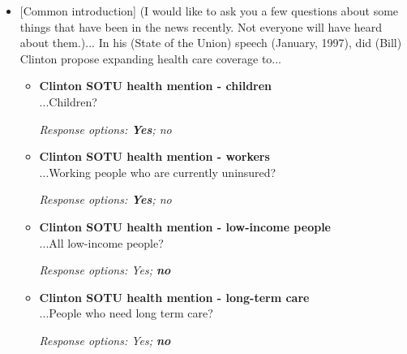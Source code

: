 \documentclass[12pt, letterpaper]{article}
\begin{document}
\begin{itemize}
\item{[Common introduction] (I would like to ask you a few questions about some things that have been in the news recently. Not everyone will have heard about them.)... In his (State of the Union) speech (January, 1997), did (Bill) Clinton propose expanding health care coverage to...

   \begin{itemize}
\item \textbf{Clinton SOTU health mention - children} \\
...Children?

\textit{Response options: \textbf{Yes}; no} 
\end{itemize}

   \begin{itemize}
\item \textbf{Clinton SOTU health mention - workers} \\
...Working people who are currently uninsured?

\textit{Response options: \textbf{Yes}; no}
\end{itemize}

   \begin{itemize}
\item \textbf{Clinton SOTU health mention - low-income people} \\
...All low-income people?

\textit{Response options: Yes; \textbf{no}} 
\end{itemize}

   \begin{itemize}
\item \textbf{Clinton SOTU health mention - long-term care} \\
...People who need long term care?

\textit{Response options: Yes; \textbf{no}} 
\end{itemize}}
\end{itemize}
\end{document}
